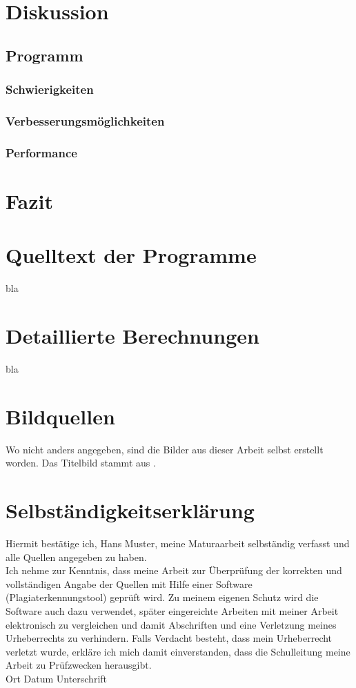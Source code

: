 \documentclass[11pt,DIV=10,final]{scrreprt} %
\begin{document}
\chapter{Diskussion}
\section{Programm}
\subsection{Schwierigkeiten}
\subsection{Verbesserungsmöglichkeiten}
\subsection{Performance}
\chapter{Fazit}



%
\begin{appendix} %
%
\chapter{Quelltext der Programme}
%
bla
\chapter{Detaillierte Berechnungen}
%
bla
%
\end{appendix}
%
\chapter*{Bildquellen}
%
Wo nicht anders angegeben, sind die Bilder aus dieser Arbeit selbst erstellt worden. Das Titelbild stammt aus \citet{wikipediapendel}.
%


%
\chapter*{Selbständigkeitserklärung}
%
Hiermit bestätige ich, Hans Muster, meine Maturaarbeit selbständig verfasst und alle Quellen angegeben zu haben.\\\newline
Ich nehme zur Kenntnis, dass meine Arbeit zur Überprüfung der korrekten und vollständigen Angabe der Quellen mit Hilfe einer Software (Plagiaterkennungstool) geprüft wird. Zu meinem eigenen Schutz wird die Software auch dazu verwendet, später eingereichte Arbeiten mit meiner Arbeit elektronisch zu vergleichen und damit Abschriften und eine Verletzung meines Urheberrechts zu verhindern. Falls Verdacht besteht, dass mein Urheberrecht verletzt wurde, erkläre ich mich damit einverstanden, dass die Schulleitung meine Arbeit zu Prüfzwecken herausgibt.\\\newline
Ort\hspace{4cm} Datum\hspace{4cm}  Unterschrift
%
\end{document}
